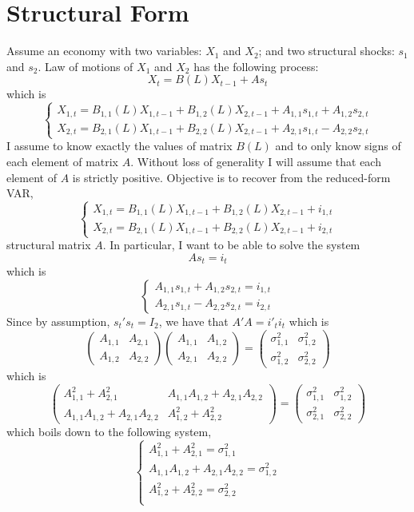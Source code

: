 \documentclass[14pt]{article}
\begin{document}
\section*{Structural Form}

Assume an economy with two variables: $X_1$ and $X_2$; and two structural shocks: $s_1$ and $s_2$. Law of motions of $X_1$ and $X_2$ has the following process:
$$
X_t = B(L)X_{t-1} + As_t
$$
which is
$$
\begin{cases}
X_{1,t} = B_{1,1}(L)X_{1,t-1} + B_{1,2}(L)X_{2,t-1} + A_{1,1}s_{1,t} + A_{1,2}s_{2,t} \\
X_{2,t} = B_{2,1}(L)X_{1,t-1} + B_{2,2}(L)X_{2,t-1} + A_{2,1}s_{1,t} - A_{2,2}s_{2,t}
\end{cases}
$$
I assume to know exactly the values of matrix $B(L)$ and to only know signs of each element of matrix $A$. Without loss of generality I will assume that each element of $A$ is strictly positive. Objective is to recover from the reduced-form VAR,
$$
\begin{cases}
X_{1,t} = B_{1,1}(L)X_{1,t-1} + B_{1,2}(L)X_{2,t-1} + i_{1,t} \\
X_{2,t} = B_{2,1}(L)X_{1,t-1} + B_{2,2}(L)X_{2,t-1} + i_{2,t}
\end{cases}
$$
structural matrix $A$. In particular, I want to be able to solve the system
$$
As_t = i_t
$$
which is
$$
\begin{cases}
A_{1,1}s_{1,t} + A_{1,2}s_{2,t} = i_{1,t} \\
A_{2,1}s_{1,t} - A_{2,2}s_{2,t} = i_{2,t}
\end{cases}
$$
Since by assumption, $s_t's_t = I_2$, we have that $A'A = i'_t i_t$ which is
$$
\begin{pmatrix}
A_{1,1} & A_{2,1} \\
A_{1,2} & A_{2,2}
\end{pmatrix} \begin{pmatrix}
A_{1,1} & A_{1,2} \\
A_{2,1} & A_{2,2}
\end{pmatrix} = \begin{pmatrix}
\sigma^2_{1,1} & \sigma^2_{1,2} \\
\sigma^2_{1,2} & \sigma^2_{2,2}
\end{pmatrix}
$$
which is
$$
\begin{pmatrix}
A_{1,1}^2 + A_{2,1}^2 & A_{1,1} A_{1,2} + A_{2,1} A_{2,2}  \\
A_{1,1} A_{1,2} + A_{2,1} A_{2,2}  & A_{1,2}^2 + A_{2,2}^2
\end{pmatrix} = \begin{pmatrix}
\sigma^2_{1,1} & \sigma^2_{1,2} \\
\sigma^2_{2,1} & \sigma^2_{2,2}
\end{pmatrix}
$$
which boils down to the following system,
$$
\begin{cases}
A_{1,1}^2 + A_{2,1}^2 = \sigma^2_{1,1} \\
A_{1,1} A_{1,2} + A_{2,1} A_{2,2} = \sigma^2_{1,2} \\
A_{1,2}^2 + A_{2,2}^2 = \sigma^2_{2,2} \\
\end{cases}
$$
\end{document}
